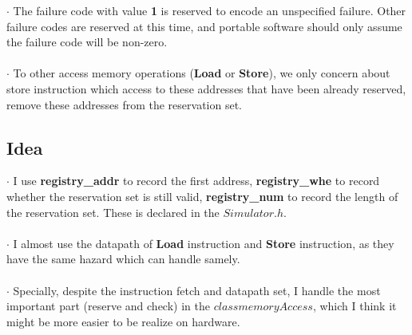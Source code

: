 \documentclass{article}
\begin{document}
$\cdot$     The failure code with value \textbf{1} is reserved to encode an unspecified failure. Other failure codes are reserved at this time, and portable software should only assume the failure code will be non-zero. \\\\
$\cdot$     To other access memory operations (\textbf{Load} or \textbf{Store}), we only concern about store instruction which access to these addresses that have been already reserved, remove these addresses from the reservation set.
\subsection{Idea}
$\cdot$ I use \textbf{registry\_addr} to record the first address, \textbf{registry\_whe} to record whether the reservation set is still valid, \textbf{registry\_num} to record the length of the reservation set. These is declared in the $Simulator.h$.\\\\
$\cdot$ I almost use the datapath of \textbf{Load} instruction and \textbf{Store} instruction, as they have the same hazard which can handle samely.\\\\
$\cdot$ Specially, despite the instruction fetch and datapath set, I handle the most important part (reserve and check) in the $class memoryAccess$, which I think it might be more easier to be realize on hardware.\\\\ 
\end{document}

